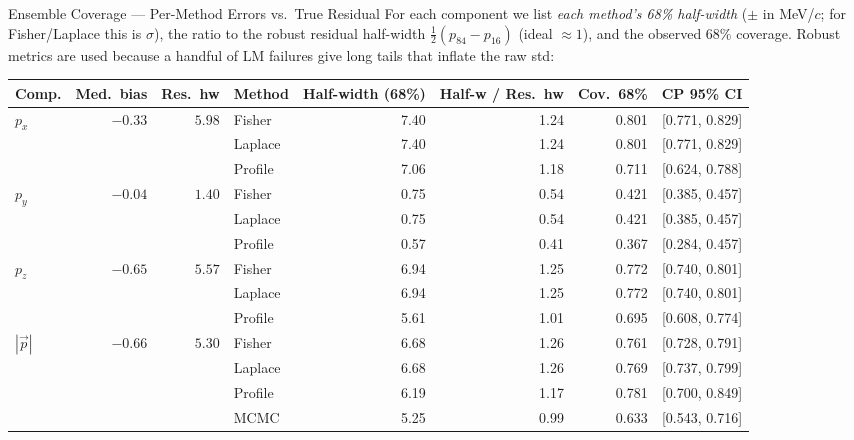 \documentclass[aspectratio=169]{beamer}
\begin{document}
\begin{frame}{Ensemble Coverage --- Per-Method Errors vs.\ True Residual}
\scriptsize
For each component we list \emph{each method's 68\% half-width} ($\pm$ in MeV/$c$; for Fisher/Laplace this is $\sigma$), the ratio to the robust residual half-width $\tfrac{1}{2}(p_{84}{-}p_{16})$ (ideal $\approx 1$), and the observed 68\% coverage. Robust metrics are used because a handful of LM failures give long tails that inflate the raw std:

\begin{table}
\centering\scriptsize
\begin{tabular}{lrrlrrrc}
\toprule
Comp. & Med.\ bias & Res.\ hw & Method & Half-width (68\%) & Half-w / Res.\ hw & Cov.\ 68\% & CP 95\% CI \\
\midrule
\multirow{3}{*}{$p_x$} & \multirow{3}{*}{$-0.33$} & \multirow{3}{*}{$5.98$}
  & Fisher  & 7.40 & 1.24 & 0.801 & [0.771, 0.829] \\
  & & & Laplace & 7.40 & 1.24 & 0.801 & [0.771, 0.829] \\
  & & & Profile & 7.06 & 1.18 & 0.711 & [0.624, 0.788] \\
\midrule
\multirow{3}{*}{$p_y$} & \multirow{3}{*}{$-0.04$} & \multirow{3}{*}{$1.40$}
  & Fisher  & 0.75 & 0.54 & 0.421 & [0.385, 0.457] \\
  & & & Laplace & 0.75 & 0.54 & 0.421 & [0.385, 0.457] \\
  & & & Profile & 0.57 & 0.41 & 0.367 & [0.284, 0.457] \\
\midrule
\multirow{3}{*}{$p_z$} & \multirow{3}{*}{$-0.65$} & \multirow{3}{*}{$5.57$}
  & Fisher  & 6.94 & 1.25 & 0.772 & [0.740, 0.801] \\
  & & & Laplace & 6.94 & 1.25 & 0.772 & [0.740, 0.801] \\
  & & & Profile & 5.61 & 1.01 & 0.695 & [0.608, 0.774] \\
\midrule
\multirow{4}{*}{$|\vec{p}|$} & \multirow{4}{*}{$-0.66$} & \multirow{4}{*}{$5.30$}
  & Fisher  & 6.68 & 1.26 & 0.761 & [0.728, 0.791] \\
  & & & Laplace & 6.68 & 1.26 & 0.769 & [0.737, 0.799] \\
  & & & Profile & 6.19 & 1.17 & 0.781 & [0.700, 0.849] \\
  & & & MCMC    & 5.25 & 0.99 & 0.633 & [0.543, 0.716] \\
\bottomrule
\end{tabular}
\end{table}


\end{frame}
\end{document}
